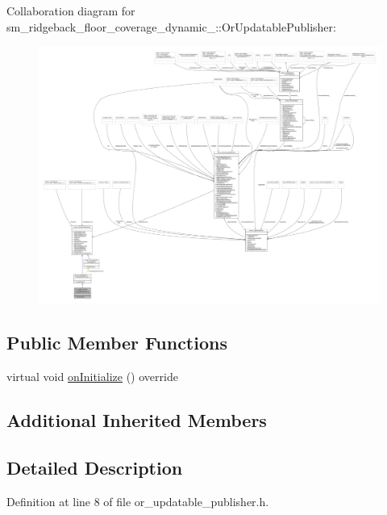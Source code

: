Collaboration diagram for sm\+\_\+ridgeback\+\_\+floor\+\_\+coverage\+\_\+dynamic\+\_\+:\+:Or\+Updatable\+Publisher\+:
\nopagebreak
\begin{figure}[H]
\begin{center}
\leavevmode
\includegraphics[width=350pt]{classsm__ridgeback__floor__coverage__dynamic__1_1_1OrUpdatablePublisher__coll__graph}
\end{center}
\end{figure}
\subsection*{Public Member Functions}
\begin{DoxyCompactItemize}
\item 
virtual void \hyperlink{classsm__ridgeback__floor__coverage__dynamic__1_1_1OrUpdatablePublisher_a4d7f3d49e6075c036021b958ced9895d}{on\+Initialize} () override
\end{DoxyCompactItemize}
\subsection*{Additional Inherited Members}


\subsection{Detailed Description}


Definition at line 8 of file or\+\_\+updatable\+\_\+publisher.\+h.




